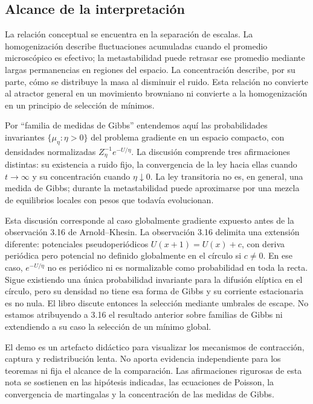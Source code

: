 \documentclass[11pt,a4paper]{article}
\theoremstyle{remark}\newtheorem{remark}{Observación}
\begin{document}
\subsection{Alcance de la interpretación}
La relación conceptual se encuentra en la separación de escalas. La homogenización describe fluctuaciones acumuladas cuando el promedio microscópico es efectivo; la metastabilidad puede retrasar ese promedio mediante largas permanencias en regiones del espacio. La concentración describe, por su parte, cómo se distribuye la masa al disminuir el ruido. Esta relación no convierte al atractor general en un movimiento browniano ni convierte a la homogenización en un principio de selección de mínimos.

Por ``familia de medidas de Gibbs'' entendemos aquí las probabilidades invariantes $\{\mu_\eta:\eta>0\}$ del problema gradiente en un espacio compacto, con densidades normalizadas $Z_\eta^{-1}e^{-U/\eta}$. La discusión comprende tres afirmaciones distintas: su existencia a ruido fijo, la convergencia de la ley hacia ellas cuando $t\to\infty$ y su concentración cuando $\eta\downarrow0$. La ley transitoria no es, en general, una medida de Gibbs; durante la metastabilidad puede aproximarse por una mezcla de equilibrios locales con pesos que todavía evolucionan.

Esta discusión corresponde al caso globalmente gradiente expuesto antes de la observación 3.16 de Arnold--Khesin. La observación 3.16 delimita una extensión diferente: potenciales pseudoperiódicos $U(x+1)=U(x)+c$, con deriva periódica pero potencial no definido globalmente en el círculo si $c\ne0$. En ese caso, $e^{-U/\eta}$ no es periódico ni es normalizable como probabilidad en toda la recta. Sigue existiendo una única probabilidad invariante para la difusión elíptica en el círculo, pero su densidad no tiene esa forma de Gibbs y su corriente estacionaria es no nula. El libro discute entonces la selección mediante umbrales de escape. No estamos atribuyendo a 3.16 el resultado anterior sobre familias de Gibbs ni extendiendo a su caso la selección de un mínimo global.

El demo \cite{demo} es un artefacto didáctico para visualizar los mecanismos de contracción, captura y redistribución lenta. No aporta evidencia independiente para los teoremas ni fija el alcance de la comparación. Las afirmaciones rigurosas de esta nota se sostienen en las hipótesis indicadas, las ecuaciones de Poisson, la convergencia de martingalas y la concentración de las medidas de Gibbs.
\end{document}
